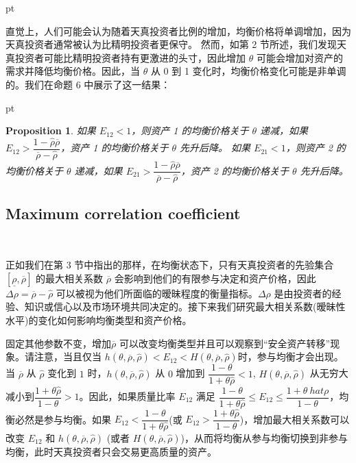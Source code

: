 \documentclass[10.0pt]{article}
\newtheorem{prop}{Proposition}
\begin{document}
 pt


直觉上，人们可能会认为随着天真投资者比例的增加，均衡价格将单调增加，因为天真投资者通常被认为比精明投资者更保守。 然而，如第 2 节所述，我们发现天真投资者可能比精明投资者持有更激进的头寸，因此增加 $\theta $ 可能会增加对资产的需求并降低均衡价格。因此，当 $ \theta $ 从 0 到 1 变化时，均衡价格变化可能是非单调的。我们在命题 6 中展示了这一结果：

 pt

\begin{prop}



如果 $ E_{1 2} < 1 $，则资产 1 的均衡价格关于 $ \theta $ 递减，如果 $ E_{1 2} > \dfrac{1 - {\hat \rho} \overline{\rho}}{\overline{\rho} - {\hat \rho}} $，资产 1 的均衡价格关于 $ \theta $ 先升后降。
如果 $ E_{2 1} < 1 $，则资产 2 的均衡价格关于 $ \theta $ 递减，如果 $ E_{2 1} > \dfrac{1 - {\hat \rho} \overline{\rho}}{\overline{\rho} - {\hat \rho}} $，资产 2 的均衡价格关于 $ \theta $ 先升后降。
\end{prop}

\subsection{Maximum correlation coefficient}

\quad \ 


正如我们在第 3 节中指出的那样，在均衡状态下，只有天真投资者的先验集合 $ [\underline{\rho}, \overline{\rho}] $ 的最大相关系数 $ \overline{\rho} $ 会影响到他们的有限参与决定和资产价格，因此 $ \Delta \rho = \overline{\rho} - \hat{\rho} $ 可以被视为他们所面临的暧昧程度的衡量指标。$\Delta \rho $ 是由投资者的经验、知识或信心以及市场环境共同决定的。接下来我们研究最大相关系数(暧昧性水平)的变化如何影响均衡类型和资产价格。



固定其他参数不变，增加$ \overline{\rho} $ 可以改变均衡类型并且可以观察到“安全资产转移”现象。请注意，当且仅当 $ h (\theta, \overline{\rho}, {\hat \rho}) < E_{12} < H (\theta, \overline{\rho}, {\hat \rho})$时，参与均衡才会出现。当 $ \overline{\rho} $ 从 $ \hat{\rho} $ 变化到 $1$ 时，$ h (\theta, \overline{\rho}, {\hat \rho}) $ 从 $0$ 增加到 $ \dfrac{1 - \theta}{1 + \theta \hat{\rho}} < 1 $, $ H (\theta, \overline{\rho}, {\hat \rho}) $ 从无穷大减小到$ \dfrac{1 + \theta \hat{\rho}}{1 - \theta} > 1 $。因此，如果质量比率 $ E_{12} $ 满足 $ \dfrac{1 - \theta}{1 + \theta\hat{\rho}} \leqslant E_{12} \leqslant \dfrac{1 + \theta\ hat{\rho}}{1 - \theta} $，均衡必然是参与均衡。如果 $ E_{12} < \dfrac{1 - \theta}{1 + \theta \hat{\rho}} $(或 $ E_{12} > \dfrac{1 + \theta \hat{\rho} }{1 - \theta} $)，增加最大相关系数可以改变 $ E_{12} $ 和 $ h (\theta, \overline{\rho}, {\hat \rho}) $ (或者 $H (\theta, \overline{\rho}, {\hat \rho}) $)，从而将均衡从参与均衡切换到非参与均衡，此时天真投资者只会交易更高质量的资产。
\end{document}
